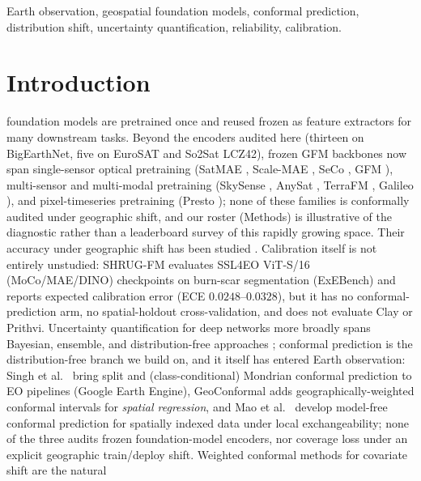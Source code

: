 \documentclass[journal]{IEEEtran}
\renewcommand{\_}{\textunderscore\allowbreak}
\begin{document}
\begin{IEEEkeywords}
Earth observation, geospatial foundation models, conformal prediction, distribution shift, uncertainty
quantification, reliability, calibration.
\end{IEEEkeywords}

\section{Introduction}\label{sec:intro}
 foundation models are pretrained once and reused frozen as feature extractors for many downstream
tasks. Beyond the encoders audited here (thirteen on BigEarthNet, five on EuroSAT and So2Sat LCZ42), frozen GFM
backbones now span single-sensor optical pretraining
(SatMAE \citep{cong2022satmae}, Scale-MAE \citep{reed2023scalemae}, SeCo \citep{manas2021seasonal}, GFM
\citep{mendieta2023gfm}), multi-sensor and multi-modal pretraining (SkySense
\citep{guo2024skysense}, AnySat \citep{astruc2025anysat}, TerraFM \citep{danish2025terrafm}, Galileo
\citep{tseng2025galileo}), and pixel-timeseries pretraining (Presto \citep{tseng2023presto}); none of these
families is conformally audited under geographic shift, and our roster (Methods) is illustrative
of the diagnostic rather than a leaderboard survey of this rapidly growing space. Their accuracy under geographic shift has been studied \citep{cohrs2025shrugfm,tamazyan2025geocrossbench}. Calibration itself
is not entirely unstudied: SHRUG-FM \citep{cohrs2025shrugfm} evaluates SSL4EO ViT-S/16 (MoCo/MAE/DINO) checkpoints on
burn-scar segmentation (ExEBench) and reports expected calibration error (ECE $0.0248$--$0.0328$), but it has
no conformal-prediction arm, no spatial-holdout cross-validation, and does not evaluate Clay or Prithvi.
Uncertainty quantification for deep networks more broadly spans Bayesian, ensemble, and distribution-free
approaches \citep{gawlikowski2023survey}; conformal prediction is the distribution-free branch we build on, and
it itself has entered Earth observation: Singh et al.~\citep{singh2024uncertainty} bring split and
(class-conditional) Mondrian conformal prediction to EO pipelines (Google Earth Engine), GeoConformal
\citep{lou2024geoconformal} adds geographically-weighted conformal intervals for \emph{spatial regression}, and
Mao et al.~\citep{mao2024spatial} develop model-free conformal prediction for spatially indexed data under local
exchangeability; none of the three audits frozen foundation-model encoders, nor coverage loss under an explicit geographic
train/deploy shift. Weighted conformal methods for covariate shift \citep{tibshirani2019covariate} are the natural
\end{document}
